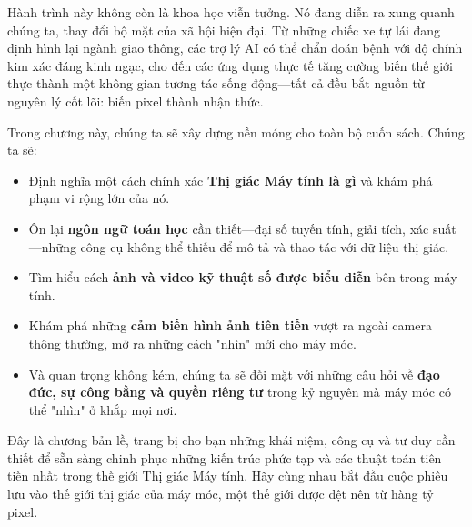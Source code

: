 Hành trình này không còn là khoa học viễn tưởng. Nó đang diễn ra xung quanh chúng ta, thay đổi bộ mặt của xã hội hiện đại. Từ những chiếc xe tự lái đang định hình lại ngành giao thông, các trợ lý AI có thể chẩn đoán bệnh với độ chính kim xác đáng kinh ngạc, cho đến các ứng dụng thực tế tăng cường biến thế giới thực thành một không gian tương tác sống động—tất cả đều bắt nguồn từ nguyên lý cốt lõi: biến pixel thành nhận thức.

Trong chương này, chúng ta sẽ xây dựng nền móng cho toàn bộ cuốn sách. Chúng ta sẽ:
\begin{itemize}
	\item Định nghĩa một cách chính xác \textbf{Thị giác Máy tính là gì} và khám phá phạm vi rộng lớn của nó.
	\item Ôn lại \textbf{ngôn ngữ toán học} cần thiết—đại số tuyến tính, giải tích, xác suất—những công cụ không thể thiếu để mô tả và thao tác với dữ liệu thị giác.
	\item Tìm hiểu cách \textbf{ảnh và video kỹ thuật số được biểu diễn} bên trong máy tính.
	\item Khám phá những \textbf{cảm biến hình ảnh tiên tiến} vượt ra ngoài camera thông thường, mở ra những cách "nhìn" mới cho máy móc.
	\item Và quan trọng không kém, chúng ta sẽ đối mặt với những câu hỏi về \textbf{đạo đức, sự công bằng và quyền riêng tư} trong kỷ nguyên mà máy móc có thể "nhìn" ở khắp mọi nơi.
\end{itemize}

Đây là chương bản lề, trang bị cho bạn những khái niệm, công cụ và tư duy cần thiết để sẵn sàng chinh phục những kiến trúc phức tạp và các thuật toán tiên tiến nhất trong thế giới Thị giác Máy tính. Hãy cùng nhau bắt đầu cuộc phiêu lưu vào thế giới thị giác của máy móc, một thế giới được dệt nên từ hàng tỷ pixel.
